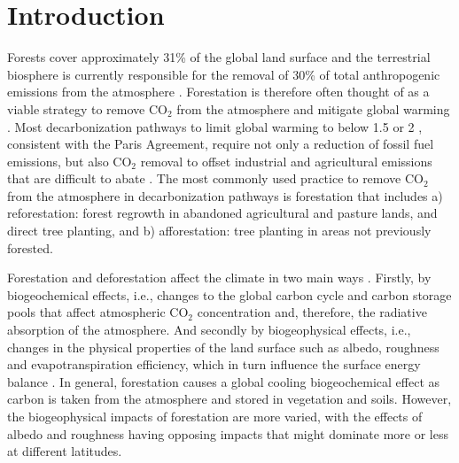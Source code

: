 \documentclass[draft]{agujournal2019}
\begin{document}

\section{Introduction}


Forests cover approximately 31\% of the global land surface \cite{luyssaert_land_2014,fao_global_2020} and the terrestrial biosphere is currently responsible for the removal of 30\% of total anthropogenic emissions from the atmosphere \cite{friedlingstein_global_2022}.
Forestation is therefore often thought of as a viable strategy to remove CO$_2$ from the atmosphere and mitigate global warming \cite{house_maximum_2002, griscom_natural_2017, smith_long-term_2022}.
Most decarbonization pathways to limit global warming to below 1.5 or 2 \textcelsius{}, consistent with the Paris Agreement, require not only a reduction of fossil fuel emissions, but also CO$_2$ removal to offset industrial and agricultural emissions that are difficult to abate \cite{babiker_crosssectoral_2022}.
The most commonly used practice to remove CO$_2$ from the atmosphere in decarbonization pathways is forestation that includes a) reforestation: forest regrowth in abandoned agricultural and pasture lands, and direct tree planting, and b) afforestation: tree planting in areas not previously forested.

Forestation and deforestation affect the climate in two main ways \cite{pongratz_biogeophysical_2010,ito_biogeophysical_2020,zhu_comparable_2023}.
Firstly, by biogeochemical effects, i.e., changes to the global carbon cycle and carbon storage pools that affect atmospheric CO$_2$ concentration and, therefore, the radiative absorption of the atmosphere.
And secondly by biogeophysical effects, i.e., changes in the physical properties of the land surface such as albedo, roughness and evapotranspiration efficiency, which in turn influence the surface energy balance \cite{betts_offset_2000,bala_combined_2007,winckler_importance_2019}.
In general, forestation causes a global cooling biogeochemical effect as carbon is taken from the atmosphere and stored in vegetation and soils.
However, the biogeophysical impacts of forestation are more varied, with the effects of albedo and roughness having opposing impacts that might dominate more or less at different latitudes.
\end{document}

